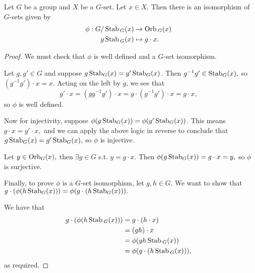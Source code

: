 \begin{theorem}
  Let $G$ be a group and $X$ be a $G$-set. Let $x\in X$. Then there is an isomorphism of $G$-sets given by
  \begin{align*}
      \phi:G/\operatorname*{Stab}{}_{G}(x)&\to \operatorname*{Orb}{}_G(x)
      \\ g\operatorname*{Stab}{}_G(x)&\mapsto g\cdot x.
  \end{align*}
  \label{thm:orbStab}
\end{theorem}
\begin{proof}
    We must check that $\phi$ is well defined and a $G$-set isomorphism.

    Let $g,g' \in G$ and suppose $g\operatorname*{Stab}_{G}(x) = g'\operatorname*{Stab}_{G}(x)$. Then $g^{-1}g'\in \operatorname*{Stab}_{G}(x),$ so $(g^{-1}g')\cdot x = x.$ Acting on the left by $g$, we see that $$g'\cdot x = (g g^{-1} g')\cdot x = g \cdot (g^{-1} g')\cdot x = g \cdot x,$$ so $\phi$ is well defined.

    Now for injectivity, suppose $\phi(g\operatorname*{Stab}_G(x)) = \phi(g'\operatorname*{Stab}_G(x))$. This means $g \cdot x = g' \cdot x,$ and we can apply the above logic in reverse to conclude that $g\operatorname*{Stab}_{G}(x) = g'\operatorname*{Stab}_{G}(x),$ so $\phi$ is injective.

    Let $y \in \operatorname*{Orb}_G(x),$ then $\exists g \in G$ s.t. $y = g \cdot x.$ Then $\phi(g\operatorname*{Stab}_G(x)) = g \cdot x = y,$ so $\phi$ is surjective.

    Finally, to prove $\phi$ is a $G$-set isomorphism, let $g,h \in G$. We want to show that $g \cdot (\phi(h\operatorname*{Stab}_G(x))) = \phi(g \cdot (h\operatorname*{Stab}_G(x))).$

    We have that
    \begin{align*}
        g \cdot (\phi(h\operatorname*{Stab}{}_G(x))) &= g \cdot (h \cdot x) \\
        &= (gh)\cdot x \\
        &= \phi(gh\operatorname*{Stab}{}_G(x)) \\
        &= \phi(g \cdot (h\operatorname*{Stab}{}_G(x))),
    \end{align*}
    as required.
\end{proof}


